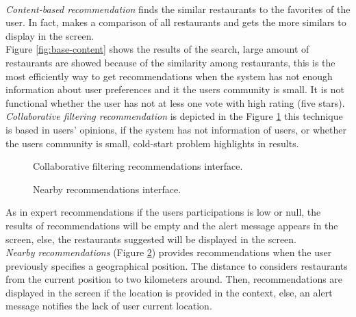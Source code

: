 \\ \textit{Content-based recommendation} finds the similar restaurants to the
favorites of the user. In fact, makes a comparison of all restaurants
and gets the more similars to display in the screen. \\
Figure \ref{fig:base-content}  
shows the results of the search, large amount of restaurants are showed
because of the similarity among restaurants, this is the most
efficiently way to get recommendations when the system has not enough
information about user preferences and it the users community is
small. It is not functional whether the user has not at less one vote
with high rating (five stars).\\
\textit{Collaborative filtering recommendation} is depicted in the 
Figure  \ref{fig:cf-recs}
this technique is based in users' opinions, if the system has not
information of users, or whether the users community is small, 
cold-start problem highlights in results. 
\begin{figure}
\captionsetup{font=footnotesize}
\centering
{}
\caption{Collaborative filtering recommendations interface.}
\label{fig:cf-recs}   
\end{figure}
\begin{figure}
\captionsetup{font=footnotesize}
\centering
{}
\caption{Nearby recommendations interface.}
\label{fig:nearby-recs}   
\end{figure}

As in expert  recommendations if the users participations 
is low or null, the results of recommendations will be empty 
and the alert message appears in the
screen, else, the restaurants suggested will be displayed 
in the screen.\\
\textit{Nearby recommendations} (Figure \ref{fig:nearby-recs}) 
provides recommendations when the
user previously specifies a geographical position. The distance to
considers restaurants from the current position to two kilometers
around. Then, recommendations are displayed in the screen if the
location is provided in the context, else, an alert message  notifies
the lack of user current location.

